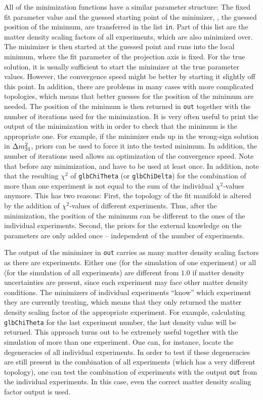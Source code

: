 All of the minimization functions have a similar parameter structure: The fixed fit parameter value and the guessed starting point of the minimizer, \ie, the guessed position of the minimum, are transferred in the list {\tt in}. Part of this list are the matter density
scaling factors of all experiments, which are also minimized over. 
The minimizer is then started at the guessed point and runs into
the local minimum, where the fit parameter of the projection
axis is fixed. For the true solution, it is usually sufficient to start 
the minimizer at the true parameter values. However, the convergence 
speed might
be better by starting it slightly off this point. In addition, there
are problems in many cases with more complicated topologies, which means
that better guesses for the position of the minimum are needed.
The position of the minimum is then returned in {\tt out}
together with the number of iterations used for the minimization.
It is very often useful to print the output of the minimization with
 in order to check that the minimum is the
appropriate one. For example, if the minimizer ends up in the wrong-sign
solution in $\Delta m_{31}^2$, priors can be used to force it into the tested
minimum. In addition, the number of iterations used allows an optimization
of the convergence speed. 
% 
Note that before any minimization,  
and  have to be used at least once. In addition, note that the resulting $\chi^2$ of {\tt glbChiTheta} (or {\tt glbChiDelta}) for the combination of more than one experiment is not 
equal to the sum of the individual $\chi^2$-values anymore. This has two reasons: First, the topology of the fit manifold is altered by the addition of $\chi^2$-values of different experiments. Thus, after the minimization, the position of the minimum can be different to the ones of the individual experiments. Second, the priors for the external knowledge on the parameters are only added once -- independent of the number of experiments.

The output of the minimizer in {\tt out} carries as many matter density scaling factors as there are experiments. Either
one (for the simulation of one experiment) or all (for the simulation of
all experiments) are different from $1.0$ if matter density uncertainties
are present, since each experiment may face other matter density conditions. 
The minimizers of individual experiments ``know'' which
experiment they are currently treating, which means that they only returned the
matter density scaling factor of the appropriate experiment.
For example, calculating {\tt glbChiTheta} for the last experiment
number, the last density value will be returned.
This approach turns out to be extremely useful together with the
simulation of more than one experiment. One can, for instance, locate the
degeneracies of all individual experiments. In order to test if
these degeneracies are still present in the combination of all experiments (which has a very different topology), one can test the combination of experiments with the output {\tt out} from the individual experiments. In this case, even the correct matter density scaling factor
output is used. 

